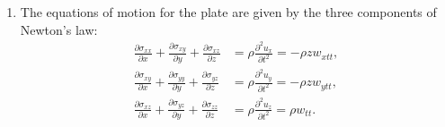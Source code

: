 \documentclass[10pt,a4paper]{article}
\begin{document}
\begin{enumerate}
The strain tensor therefore is:
\[
\boldsymbol{\epsilon}
=
-z
\begin{pmatrix}
w_{xx} & w_{xy} & 0\\
w_{xy} & w_{yy} & 0\\
0 & 0 & 0
\end{pmatrix}.
\]
\item The equations of motion for the plate are given by the
three components of Newton's law:
\[
\begin{aligned}
\frac{\partial\sigma_{xx}}{\partial x}
+\frac{\partial\sigma_{xy}}{\partial y}
+\frac{\partial\sigma_{xz}}{\partial z}
&=\rho\frac{\partial^2u_x}{\partial t^2}
=-\rho z w_{xtt},\\[8pt]
\frac{\partial\sigma_{xy}}{\partial x}
+\frac{\partial\sigma_{yy}}{\partial y}
+\frac{\partial\sigma_{yz}}{\partial z}
&=\rho\frac{\partial^2u_y}{\partial t^2}
=-\rho z w_{ytt},\\[8pt]
\frac{\partial\sigma_{xz}}{\partial x}
+\frac{\partial\sigma_{yz}}{\partial y}
+\frac{\partial\sigma_{zz}}{\partial z}
&=\rho\frac{\partial^2u_z}{\partial t^2}
=\rho w_{tt}.
\end{aligned}
\]
\end{enumerate}
\end{document}
